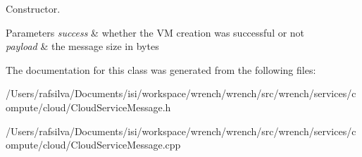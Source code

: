 Constructor. 


\begin{DoxyParams}{Parameters}
{\em success} & whether the VM creation was successful or not \\
\hline
{\em payload} & the message size in bytes \\
\hline
\end{DoxyParams}


The documentation for this class was generated from the following files\+:\begin{DoxyCompactItemize}
\item 
/\+Users/rafsilva/\+Documents/isi/workspace/wrench/wrench/src/wrench/services/compute/cloud/Cloud\+Service\+Message.\+h\item 
/\+Users/rafsilva/\+Documents/isi/workspace/wrench/wrench/src/wrench/services/compute/cloud/Cloud\+Service\+Message.\+cpp\end{DoxyCompactItemize}

